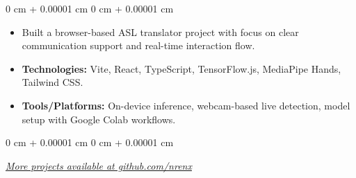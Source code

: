 \documentclass[10pt, a4paper]{article}
\newenvironment{highlights}{
    \begin{itemize}[
        topsep=0.06 cm,
        parsep=0.04 cm,
        partopsep=0pt,
        itemsep=0.02 cm,
        leftmargin=0 cm + 10pt
    ]
}{
    \end{itemize}
}
\newenvironment{onecolentry}{
    \begin{adjustwidth}{
        0 cm + 0.00001 cm
    }{
        0 cm + 0.00001 cm
    }
}{
    \end{adjustwidth}
}
\begin{document}
    \vspace{0.2 cm}
    \begin{onecolentry}
        \begin{highlights}
            \item Built a browser-based ASL translator project with focus on clear communication support and real-time interaction flow.
            \item \textbf{Technologies:} Vite, React, TypeScript, TensorFlow.js, MediaPipe Hands, Tailwind CSS.
            \item \textbf{Tools/Platforms:} On-device inference, webcam-based live detection, model setup with Google Colab workflows.
        \end{highlights}
    \end{onecolentry}

    \vspace{0.2 cm}
    \begin{onecolentry}
        \small{\textit{\href{https://github.com/nrenx}{More projects available at github.com/nrenx}}}
    \end{onecolentry}

    \vspace{0.05 cm}
\end{document}
